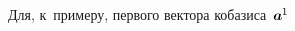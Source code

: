 \begin{otherlanguage}{russian}

\begin{comment} %
\vspace{-0.5em}\[
\bm{a}_i \dotp \bm{a}^{\hspace{0.1ex}j} \hspace{-0.1ex} = \hspace{-0.2ex}
\scalebox{0.8}[0.8]{$\left[ \begin{array}{ccc}
\bm{a}_1 \hspace{-0.1ex} \dotp \bm{a}^{\hspace{-0.1ex}1} & \bm{a}_1 \hspace{-0.1ex} \dotp \bm{a}^2 & \bm{a}_1 \hspace{-0.1ex} \dotp \bm{a}^3 \\
\bm{a}_2 \hspace{-0.1ex} \dotp \bm{a}^{\hspace{-0.1ex}1} & \bm{a}_2 \hspace{-0.1ex} \dotp \bm{a}^2 & \bm{a}_2 \hspace{-0.1ex} \dotp \bm{a}^3 \\
\bm{a}_3 \hspace{-0.1ex} \dotp \bm{a}^{\hspace{-0.1ex}1} & \bm{a}_3 \hspace{-0.1ex} \dotp \bm{a}^2 & \bm{a}_3 \hspace{-0.1ex} \dotp \bm{a}^3
\end{array} \right]$} \!=\!
\scalebox{0.8}[0.8]{$\left[ \begin{array}{ccc}
1 & 0 & 0 \\
0 & 1 & 0 \\
0 & 0 & 1
\end{array} \right]$} \!=
\hspace{0.1ex} \delta_i^{\hspace{0.1ex}j}
\]
\end{comment} %

Для, к~примеру, первого вектора кобазиса~${\bm{a}^{\hspace{-0.1ex}1}\hspace{-0.1ex}}$


\end{otherlanguage}
